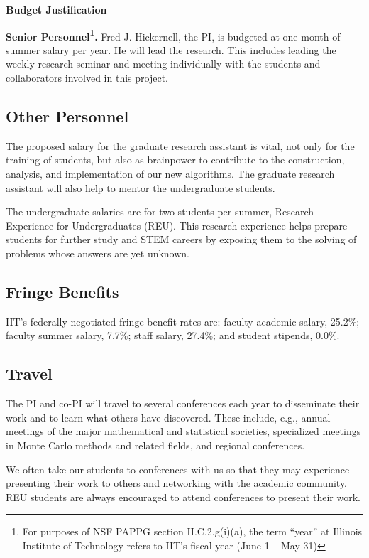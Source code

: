 \documentclass[11pt]{NSFamsart}
\begin{document}

\centerline{\textbf{\Large Budget Justification}}

\bigskip

\noindent\textbf{Senior Personnel\footnote{For purposes of NSF PAPPG section II.C.2.g(i)(a), the term “year” at Illinois Institute of Technology refers to IIT’s fiscal year (June 1 – May 31)}.}
Fred J. Hickernell, the PI, is budgeted at one month of summer salary per year.  He will lead the research.  This includes leading the weekly research seminar and  meeting individually with the 
students and collaborators involved in this project.

\subsection*{Other Personnel}
The proposed salary for the graduate research assistant is vital, not only for the training of students, 
but also as brainpower to contribute to the construction, analysis, and implementation of our new 
algorithms.  The graduate research assistant will also help to mentor the undergraduate students.

The undergraduate salaries are for two students per summer, Research Experience for Undergraduates (REU).  This research experience helps 
prepare students for further study and STEM careers by exposing them to the solving of problems 
whose answers are yet unknown.

\subsection*{Fringe Benefits}
IIT’s federally negotiated fringe benefit rates are: faculty academic salary, 25.2\%; faculty summer salary, 7.7\%; staff salary, 27.4\%; and student stipends, 0.0\%.

\subsection*{Travel}
The PI and co-PI will travel to several conferences each year to disseminate their work and to learn 
what others have discovered.  These include, e.g., annual meetings of the major mathematical and 
statistical societies, specialized meetings in Monte Carlo methods and related fields, and regional 
conferences. 

We often take our students to conferences with us so that they may  experience 
presenting their work to others and networking with the academic community.  REU students are always 
encouraged to attend conferences to present their work. 
\end{document}
